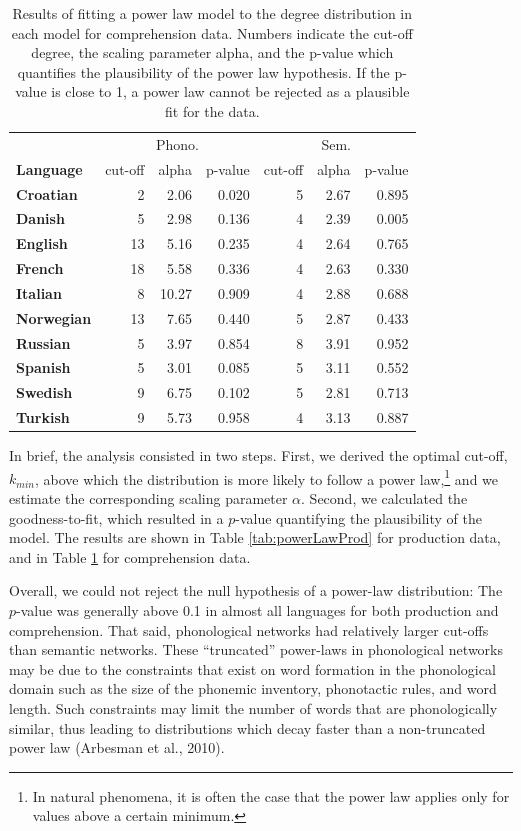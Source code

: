 \documentclass[english,floatsintext,man]{apa6}
\theoremstyle{definition}
\theoremstyle{definition}
\theoremstyle{definition}
\theoremstyle{remark}
\begin{document}
\begin{table}

\caption{\label{tab:powerLawComp}Results of fitting a power law model to the degree distribution in each model for comprehension data. Numbers indicate the cut-off degree, the scaling parameter alpha, and the p-value which quantifies the plausibility of the power law hypothesis. If the p-value is close to 1, a power law cannot be rejected as a plausible fit for the data.}
\centering
\begin{tabular}[t]{>{\bfseries}lrrrrrr}
\toprule
\multicolumn{1}{c}{} & \multicolumn{3}{c}{Phono.} & \multicolumn{3}{c}{Sem.} \\
\cmidrule(l{2pt}r{2pt}){2-4} \cmidrule(l{2pt}r{2pt}){5-7}
Language & cut-off & alpha & p-value & cut-off & alpha & p-value\\
\midrule
Croatian & 2 & 2.06 & 0.020 & 5 & 2.67 & 0.895\\
Danish & 5 & 2.98 & 0.136 & 4 & 2.39 & 0.005\\
English & 13 & 5.16 & 0.235 & 4 & 2.64 & 0.765\\
French & 18 & 5.58 & 0.336 & 4 & 2.63 & 0.330\\
Italian & 8 & 10.27 & 0.909 & 4 & 2.88 & 0.688\\
Norwegian & 13 & 7.65 & 0.440 & 5 & 2.87 & 0.433\\
Russian & 5 & 3.97 & 0.854 & 8 & 3.91 & 0.952\\
Spanish & 5 & 3.01 & 0.085 & 5 & 3.11 & 0.552\\
Swedish & 9 & 6.75 & 0.102 & 5 & 2.81 & 0.713\\
Turkish & 9 & 5.73 & 0.958 & 4 & 3.13 & 0.887\\
\bottomrule
\end{tabular}
\end{table}

In brief, the analysis consisted in two steps. First, we derived the
optimal cut-off, \(k_{min}\), above which the distribution is more
likely to follow a power
law,\footnote{In natural phenomena, it is often the case that the power law applies only for values above a certain minimum.}
and we estimate the corresponding scaling parameter \(\alpha\). Second,
we calculated the goodness-to-fit, which resulted in a \(p\)-value
quantifying the plausibility of the model. The results are shown in
Table \ref{tab:powerLawProd} for production data, and in Table
\ref{tab:powerLawComp} for comprehension data.

Overall, we could not reject the null hypothesis of a power-law
distribution: The \(p\)-value was generally above 0.1 in almost all
languages for both production and comprehension. That said, phonological
networks had relatively larger cut-offs than semantic networks. These
\enquote{truncated} power-laws in phonological networks may be due to
the constraints that exist on word formation in the phonological domain
such as the size of the phonemic inventory, phonotactic rules, and word
length. Such constraints may limit the number of words that are
phonologically similar, thus leading to distributions which decay faster
than a non-truncated power law (Arbesman et al., 2010).
\end{document}
